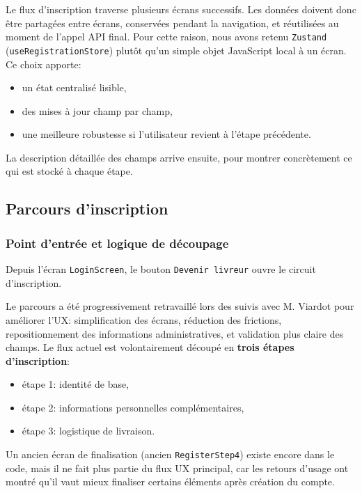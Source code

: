 Le flux d'inscription traverse plusieurs écrans successifs. Les données doivent donc être partagées entre écrans, conservées pendant la navigation, et réutilisées au moment de l'appel API final. Pour cette raison, nous avons retenu \texttt{Zustand} (\texttt{useRegistrationStore}) plutôt qu'un simple objet JavaScript local à un écran. Ce choix apporte:
\begin{itemize}
    \item un état centralisé lisible,
    \item des mises à jour champ par champ,
    \item une meilleure robustesse si l'utilisateur revient à l'étape précédente.
\end{itemize}

La description détaillée des champs arrive ensuite, pour montrer concrètement ce qui est stocké à chaque étape.

\subsection{Parcours d'inscription}

\subsubsection{Point d'entrée et logique de découpage}

Depuis l'écran \texttt{LoginScreen}, le bouton \texttt{Devenir livreur} ouvre le circuit d'inscription.

Le parcours a été progressivement retravaillé lors des suivis avec M. Viardot pour améliorer l'UX: simplification des écrans, réduction des frictions, repositionnement des informations administratives, et validation plus claire des champs. Le flux actuel est volontairement découpé en \textbf{trois étapes d'inscription}:
\begin{itemize}
    \item étape 1: identité de base,
    \item étape 2: informations personnelles complémentaires,
    \item étape 3: logistique de livraison.
\end{itemize}

Un ancien écran de finalisation (ancien \texttt{RegisterStep4}) existe encore dans le code, mais il ne fait plus partie du flux UX principal, car les retours d'usage ont montré qu'il vaut mieux finaliser certains éléments après création du compte.

